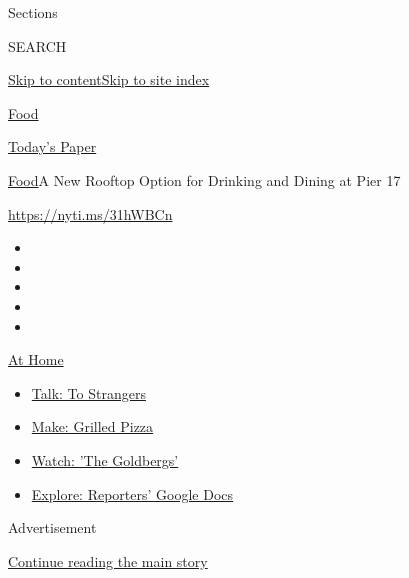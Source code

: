 Sections

SEARCH

\protect\hyperlink{site-content}{Skip to
content}\protect\hyperlink{site-index}{Skip to site index}

\href{https://www.nytimes.com/section/food}{Food}

\href{https://myaccount.nytimes.com/auth/login?response_type=cookie\&client_id=vi}{}

\href{https://www.nytimes.com/section/todayspaper}{Today's Paper}

\href{/section/food}{Food}\textbar{}A New Rooftop Option for Drinking
and Dining at Pier 17

\url{https://nyti.ms/31hWBCn}

\begin{itemize}
\item
\item
\item
\item
\item
\end{itemize}

\href{https://www.nytimes.com/spotlight/at-home?action=click\&pgtype=Article\&state=default\&region=TOP_BANNER\&context=at_home_menu}{At
Home}

\begin{itemize}
\tightlist
\item
  \href{https://www.nytimes.com/2020/08/03/well/family/the-benefits-of-talking-to-strangers.html?action=click\&pgtype=Article\&state=default\&region=TOP_BANNER\&context=at_home_menu}{Talk:
  To Strangers}
\item
  \href{https://www.nytimes.com/2020/08/01/at-home/coronavirus-make-pizza-on-a-grill.html?action=click\&pgtype=Article\&state=default\&region=TOP_BANNER\&context=at_home_menu}{Make:
  Grilled Pizza}
\item
  \href{https://www.nytimes.com/2020/07/31/arts/television/goldbergs-abc-stream.html?action=click\&pgtype=Article\&state=default\&region=TOP_BANNER\&context=at_home_menu}{Watch:
  'The Goldbergs'}
\item
  \href{https://www.nytimes.com/interactive/2020/at-home/even-more-reporters-editors-diaries-lists-recommendations.html?action=click\&pgtype=Article\&state=default\&region=TOP_BANNER\&context=at_home_menu}{Explore:
  Reporters' Google Docs}
\end{itemize}

Advertisement

\protect\hyperlink{after-top}{Continue reading the main story}

